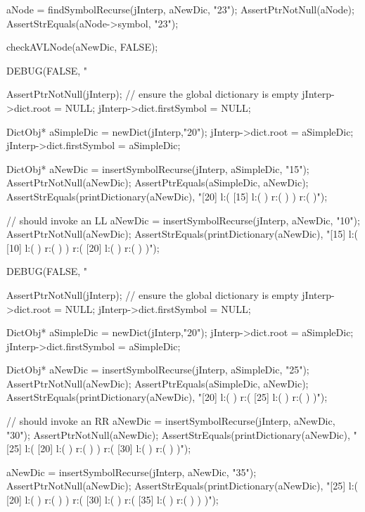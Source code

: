   aNode = findSymbolRecurse(jInterp, aNewDic, "23");
  AssertPtrNotNull(aNode);
  AssertStrEquals(aNode->symbol, "23");

  checkAVLNode(aNewDic, FALSE);
\stopCTest
\stopTestCase


\startCTest
  DEBUG(FALSE, "\n%

  AssertPtrNotNull(jInterp);
  // ensure the global dictionary is empty
  jInterp->dict.root        = NULL;
  jInterp->dict.firstSymbol = NULL;
  
  DictObj* aSimpleDic = newDict(jInterp,"20");
  jInterp->dict.root        = aSimpleDic;
  jInterp->dict.firstSymbol = aSimpleDic;

  DictObj* aNewDic = insertSymbolRecurse(jInterp, aSimpleDic, "15");
  AssertPtrNotNull(aNewDic);
  AssertPtrEquals(aSimpleDic, aNewDic);
  AssertStrEquals(printDictionary(aNewDic),
  "[20] l:( [15] l:(  ) r:(  )  ) r:(  )");

  // should invoke an LL
  aNewDic = insertSymbolRecurse(jInterp, aNewDic, "10");
  AssertPtrNotNull(aNewDic);
  AssertStrEquals(printDictionary(aNewDic),
  "[15] l:( [10] l:(  ) r:(  )  ) r:( [20] l:(  ) r:(  )  )");
\stopCTest
\stopTestCase

\startCTest
  DEBUG(FALSE, "\n%

  AssertPtrNotNull(jInterp);
  // ensure the global dictionary is empty
  jInterp->dict.root        = NULL;
  jInterp->dict.firstSymbol = NULL;

  DictObj* aSimpleDic = newDict(jInterp,"20");
  jInterp->dict.root        = aSimpleDic;
  jInterp->dict.firstSymbol = aSimpleDic;

  DictObj* aNewDic = insertSymbolRecurse(jInterp, aSimpleDic, "25");
  AssertPtrNotNull(aNewDic);
  AssertPtrEquals(aSimpleDic, aNewDic);
  AssertStrEquals(printDictionary(aNewDic),
  "[20] l:(  ) r:( [25] l:(  ) r:(  )  )");

  // should invoke an RR
  aNewDic = insertSymbolRecurse(jInterp, aNewDic, "30");
  AssertPtrNotNull(aNewDic);
  AssertStrEquals(printDictionary(aNewDic),
  "[25] l:( [20] l:(  ) r:(  )  ) r:( [30] l:(  ) r:(  )  )");

  aNewDic = insertSymbolRecurse(jInterp, aNewDic, "35");
  AssertPtrNotNull(aNewDic);
  AssertStrEquals(printDictionary(aNewDic),
  "[25] l:( [20] l:(  ) r:(  )  ) r:( [30] l:(  ) r:( [35] l:(  ) r:(  )  )  )");
\stopCTest
\stopTestCase

